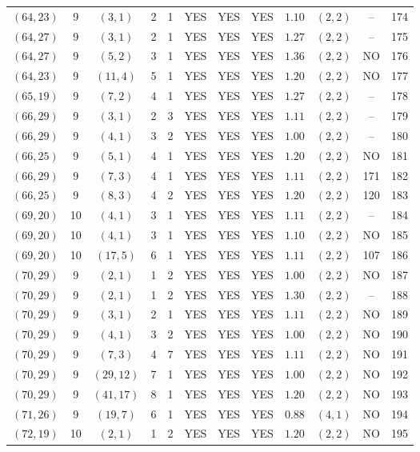 \begin{longtable}{|c|c|c|c|c|c|c|c|c|c|c|c|}
$(64,23)$ & 9 & $(3,1)$ & 2 & 1 & YES & YES & YES & $1.10$ & $(2,2)$ & -- & 174\\
$(64,27)$ & 9 & $(3,1)$ & 2 & 1 & YES & YES & YES & $1.27$ & $(2,2)$ & -- & 175\\
$(64,27)$ & 9 & $(5,2)$ & 3 & 1 & YES & YES & YES & $1.36$ & $(2,2)$ & NO & 176\\
$(64,23)$ & 9 & $(11,4)$ & 5 & 1 & YES & YES & YES & $1.20$ & $(2,2)$ & NO & 177\\
$(65,19)$ & 9 & $(7,2)$ & 4 & 1 & YES & YES & YES & $1.27$ & $(2,2)$ & -- & 178\\
$(66,29)$ & 9 & $(3,1)$ & 2 & 3 & YES & YES & YES & $1.11$ & $(2,2)$ & -- & 179\\
$(66,29)$ & 9 & $(4,1)$ & 3 & 2 & YES & YES & YES & $1.00$ & $(2,2)$ & -- & 180\\
$(66,25)$ & 9 & $(5,1)$ & 4 & 1 & YES & YES & YES & $1.20$ & $(2,2)$ & NO & 181\\
$(66,29)$ & 9 & $(7,3)$ & 4 & 1 & YES & YES & YES & $1.11$ & $(2,2)$ & 171 & 182\\
$(66,25)$ & 9 & $(8,3)$ & 4 & 2 & YES & YES & YES & $1.20$ & $(2,2)$ & 120 & 183\\
$(69,20)$ & 10 & $(4,1)$ & 3 & 1 & YES & YES & YES & $1.11$ & $(2,2)$ & -- & 184\\
$(69,20)$ & 10 & $(4,1)$ & 3 & 1 & YES & YES & YES & $1.10$ & $(2,2)$ & NO & 185\\
$(69,20)$ & 10 & $(17,5)$ & 6 & 1 & YES & YES & YES & $1.11$ & $(2,2)$ & 107 & 186\\
$(70,29)$ & 9 & $(2,1)$ & 1 & 2 & YES & YES & YES & $1.00$ & $(2,2)$ & NO & 187\\
$(70,29)$ & 9 & $(2,1)$ & 1 & 2 & YES & YES & YES & $1.30$ & $(2,2)$ & -- & 188\\
$(70,29)$ & 9 & $(3,1)$ & 2 & 1 & YES & YES & YES & $1.11$ & $(2,2)$ & NO & 189\\
$(70,29)$ & 9 & $(4,1)$ & 3 & 2 & YES & YES & YES & $1.00$ & $(2,2)$ & NO & 190\\
$(70,29)$ & 9 & $(7,3)$ & 4 & 7 & YES & YES & YES & $1.11$ & $(2,2)$ & NO & 191\\
$(70,29)$ & 9 & $(29,12)$ & 7 & 1 & YES & YES & YES & $1.00$ & $(2,2)$ & NO & 192\\
$(70,29)$ & 9 & $(41,17)$ & 8 & 1 & YES & YES & YES & $1.20$ & $(2,2)$ & NO & 193\\
$(71,26)$ & 9 & $(19,7)$ & 6 & 1 & YES & YES & YES & $0.88$ & $(4,1)$ & NO & 194\\
$(72,19)$ & 10 & $(2,1)$ & 1 & 2 & YES & YES & YES & $1.20$ & $(2,2)$ & NO & 195\\

\end{longtable}

